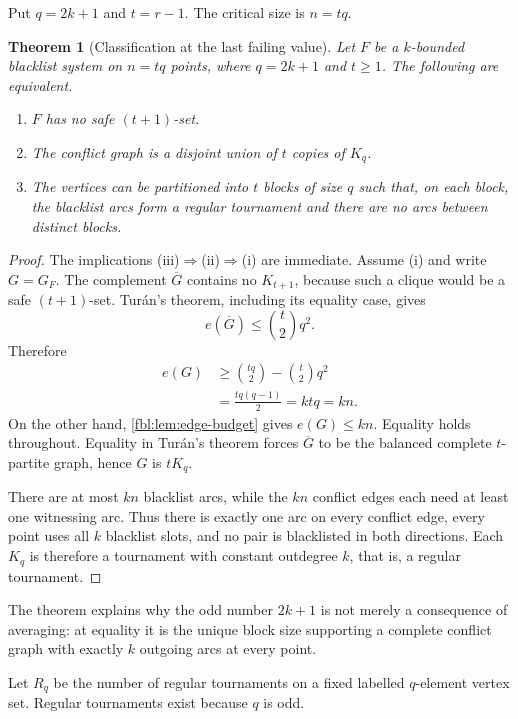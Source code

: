 \documentclass[11pt]{article}
\newtheorem{theorem}{Theorem}[section]
\theoremstyle{definition}
\theoremstyle{remark}
\begin{document}
Put $q=2k+1$ and $t=r-1$.  The critical size is $n=tq$.

\begin{theorem}[Classification at the last failing value]\label{fbl:thm:critical}
Let $F$ be a $k$-bounded blacklist system on $n=tq$ points, where
$q=2k+1$ and $t\ge1$.  The following are equivalent.
\begin{enumerate}[label=(\roman*)]
\item $F$ has no safe $(t+1)$-set.
\item The conflict graph is a disjoint union of $t$ copies of $K_q$.
\item The vertices can be partitioned into $t$ blocks of size $q$ such that,
on each block, the blacklist arcs form a regular tournament and there are no
arcs between distinct blocks.
\end{enumerate}
\end{theorem}

\begin{proof}
The implications (iii)$\Rightarrow$(ii)$\Rightarrow$(i) are immediate.
Assume (i) and write $G=G_F$.  The complement $\overline G$ contains no
$K_{t+1}$, because such a clique would be a safe $(t+1)$-set.  Tur\'an's
theorem, including its equality case, gives
\[
 e(\overline G)
 \le \binom{t}{2}q^2.
\]
Therefore
\begin{align*}
 e(G)
 &\ge \binom{tq}{2}-\binom{t}{2}q^2\\
 &=\frac{tq(q-1)}{2}
 =ktq
 =kn.
\end{align*}
On the other hand, \cref{fbl:lem:edge-budget} gives $e(G)\le kn$.  Equality
holds throughout.  Equality in Tur\'an's theorem forces $\overline G$ to be
the balanced complete $t$-partite graph, hence $G$ is $tK_q$.

There are at most $kn$ blacklist arcs, while the $kn$ conflict edges each
need at least one witnessing arc.  Thus there is exactly one arc on every
conflict edge, every point uses all $k$ blacklist slots, and no pair is
blacklisted in both directions.  Each $K_q$ is therefore a tournament with
constant outdegree $k$, that is, a regular tournament.
\end{proof}

The theorem explains why the odd number $2k+1$ is not merely a consequence
of averaging: at equality it is the unique block size supporting a complete
conflict graph with exactly $k$ outgoing arcs at every point.

Let $R_q$ be the number of regular tournaments on a fixed labelled
$q$-element vertex set.  Regular tournaments exist because $q$ is odd.
\end{document}
